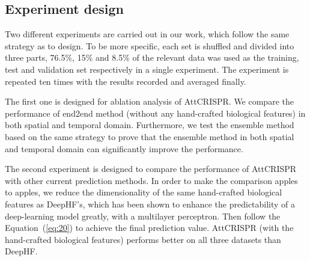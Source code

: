 \documentclass{bioinfo}
\begin{document}
\subsection{Experiment design}

Two different experiments are carried out in our work, which follow the same strategy as \citeauthor{wang2019optimized} to design.
To be more specific, each set is shuffled and divided into three parts, 76.5\%, 15\% and 8.5\% of the relevant data was used as the training, test and validation set respectively in a single experiment. 
The experiment is repeated ten times with the results recorded and averaged finally.

The first one is designed for ablation analysis of AttCRISPR. 
We compare the performance of end2end method (without any hand-crafted biological features) in both spatial and temporal domain. 
Furthermore, we test the ensemble method based on the same strategy to prove that the ensemble method in both spatial and temporal domain can significantly improve the performance. 

The second experiment is designed to compare the performance of AttCRISPR with other current prediction methods. 
In order to make the comparison apples to apples, we reduce the dimensionality of the same hand-crafted biological features as DeepHF's, 
which has been shown to enhance the predictability of a deep-learning model greatly, with a multilayer perceptron. 
Then follow the Equation~(\ref{eq:20}) to achieve the final prediction value. 
AttCRISPR (with the hand-crafted biological features) performs better on all three datasets than DeepHF. 
\end{document}
